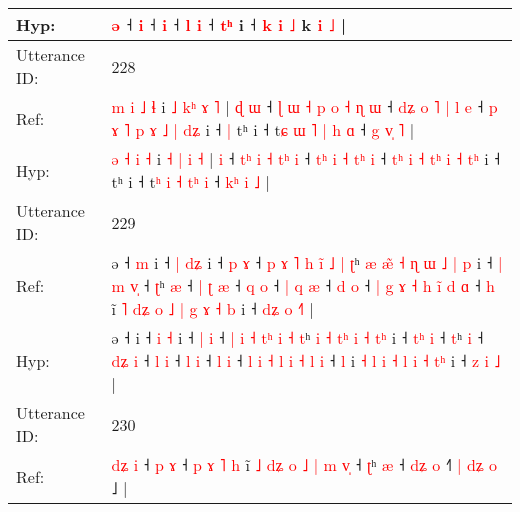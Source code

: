 \documentclass[10pt]{article}
\DeclareRobustCommand{\hl}[1]{{\textcolor{red}{#1}}}
\begin{document}
\begin{longtable}{ll}
 \\
Hyp: & \hl{}\hl{}\hl{}\hl{}\hl{ə} ˧\hl{}\hl{} \hl{i} ˧\hl{}\hl{} \hl{i} ˧\hl{}\hl{} \hl{l} \hl{i} ˧\hl{}\hl{}\hl{}\hl{} \hl{}\hl{t}\hl{ʰ} i ˧ \hl{k} \hl{i} \hl{˩} k \hl{}\hl{i} \hl{}\hl{˩} |\hl{}\hl{}\hl{}\hl{}\hl{}\hl{}\hl{}
 \\
\midrule
Utterance ID: & 228 \\
Ref: & \hl{m} \hl{i} \hl{˩} \hl{ɬ} i \hl{˩} \hl{k}\hl{ʰ} \hl{ɤ} \hl{˥} |\hl{ }\hl{ɖ} \hl{ɯ} ˧\hl{ }\hl{ɭ} \hl{ɯ}\hl{ }\hl{˧} \hl{p} \hl{o} \hl{˧}\hl{ }\hl{ɳ} \hl{ɯ} ˧ \hl{d}\hl{ʑ} \hl{o} \hl{˥} \hl{|}\hl{ }\hl{l} \hl{e} ˧ \hl{}\hl{p} \hl{ɤ} \hl{˥} \hl{p}\hl{ }\hl{ɤ} \hl{˩} \hl{|} \hl{d}\hl{ʑ} i ˧\hl{ }\hl{|} tʰ i ˧ t\hl{ɕ} \hl{ɯ} \hl{˥} \hl{|}\hl{ }\hl{h} \hl{ɑ} ˧ \hl{g}\hl{ }\hl{v}\hl{̩} \hl{˥} |
 \\
Hyp: & \hl{ə} \hl{˧} \hl{i} \hl{˧} i \hl{˧} \hl{}\hl{|} \hl{i} \hl{˧} |\hl{}\hl{} \hl{i} ˧\hl{}\hl{} \hl{}\hl{t}\hl{ʰ} \hl{i} \hl{˧} \hl{}\hl{t}\hl{ʰ} \hl{i} ˧ \hl{t}\hl{ʰ} \hl{i} \hl{˧} \hl{}\hl{t}\hl{ʰ} \hl{i} ˧ \hl{t}\hl{ʰ} \hl{i} \hl{˧} \hl{}\hl{t}\hl{ʰ} \hl{i} \hl{˧} \hl{t}\hl{ʰ} i ˧\hl{}\hl{} tʰ i ˧ t\hl{ʰ} \hl{i} \hl{˧} \hl{}\hl{t}\hl{ʰ} \hl{i} ˧ \hl{k}\hl{ʰ}\hl{ }\hl{i} \hl{˩} |
 \\
\midrule
Utterance ID: & 229 \\
Ref: & ə ˧\hl{ }\hl{m} i ˧ \hl{|} \hl{d}\hl{ʑ} i ˧ \hl{p} \hl{ɤ} ˧\hl{ }\hl{p} \hl{ɤ} \hl{˥} \hl{h} \hl{i}\hl{̃} \hl{˩} \hl{|} \hl{ʈ}ʰ \hl{æ} \hl{æ}\hl{̃} \hl{˧}\hl{ }\hl{ɳ} \hl{ɯ} \hl{˩} \hl{|}\hl{ }\hl{p} i ˧ \hl{|}\hl{ }\hl{m} \hl{v}\hl{̩} ˧ \hl{ʈ}ʰ \hl{æ} ˧ \hl{|}\hl{ }\hl{ʈ} \hl{æ} ˧ \hl{q} \hl{o} ˧\hl{ }\hl{|} \hl{q} \hl{æ} ˧ \hl{d} \hl{o} ˧ \hl{|} \hl{g} \hl{ɤ} \hl{˧} \hl{h} \hl{i}\hl{̃} \hl{d} \hl{ɑ} ˧ \hl{h} i\hl{̃} \hl{˥} \hl{d}\hl{ʑ} \hl{o} \hl{˩} \hl{|} \hl{g} \hl{ɤ} \hl{˧}\hl{ }\hl{b} i ˧ \hl{d}\hl{ʑ} \hl{o} \hl{˧}\hl{˥} |
 \\
Hyp: & ə ˧\hl{}\hl{} i ˧ \hl{i} \hl{}\hl{˧} i ˧ \hl{|} \hl{i} ˧\hl{}\hl{} \hl{|} \hl{i} \hl{˧} \hl{t}\hl{ʰ} \hl{i} \hl{˧} \hl{t}ʰ \hl{i} \hl{}\hl{˧} \hl{}\hl{t}\hl{ʰ} \hl{i} \hl{˧} \hl{}\hl{t}\hl{ʰ} i ˧ \hl{}\hl{t}\hl{ʰ} \hl{}\hl{i} ˧ \hl{t}ʰ \hl{i} ˧ \hl{}\hl{d}\hl{ʑ} \hl{i} ˧ \hl{l} \hl{i} ˧\hl{}\hl{} \hl{l} \hl{i} ˧ \hl{l} \hl{i} ˧ \hl{l} \hl{i} \hl{˧} \hl{l} \hl{i} \hl{}\hl{˧} \hl{l} \hl{i} ˧ \hl{l} i\hl{} \hl{˧} \hl{}\hl{l} \hl{i} \hl{˧} \hl{l} \hl{i} \hl{˧} \hl{}\hl{t}\hl{ʰ} i ˧ \hl{}\hl{z} \hl{i} \hl{}\hl{˩} |
 \\
\midrule
Utterance ID: & 230 \\
Ref: & \hl{d}\hl{ʑ}\hl{ }\hl{i} ˧\hl{ }\hl{p} \hl{ɤ} ˧\hl{ }\hl{p}\hl{ }\hl{ɤ}\hl{ }\hl{˥} \hl{h} i\hl{̃}\hl{ }\hl{˩} \hl{d}\hl{ʑ} \hl{o} \hl{˩} \hl{|} \hl{m} \hl{v}\hl{̩} ˧ \hl{ʈ}ʰ \hl{æ} ˧ \hl{d}\hl{ʑ} \hl{o} ˧\hl{˥}\hl{ }\hl{|} \hl{d}\hl{ʑ} \hl{o} ˩ |

\end{longtable}
\end{document}
